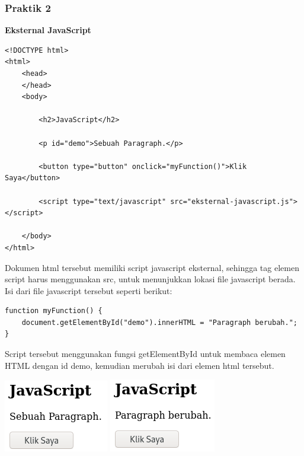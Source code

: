 \documentclass[a4paper,12pt]{article}
\begin{document}
\subsubsection{Praktik 2}
\textbf{Eksternal JavaScript\\}
\begin{lstlisting}
<!DOCTYPE html>
<html>
    <head>
    </head>
    <body>

        <h2>JavaScript</h2>

        <p id="demo">Sebuah Paragraph.</p>

        <button type="button" onclick="myFunction()">Klik Saya</button>

        <script type="text/javascript" src="eksternal-javascript.js"></script>

    </body>
</html>
\end{lstlisting}
Dokumen html tersebut memiliki script javascript eksternal, sehingga tag elemen script harus menggunakan src, untuk
menunjukkan lokasi file javascript berada. Isi dari file javascript tersebut seperti berikut:
\begin{lstlisting}
function myFunction() {
    document.getElementById("demo").innerHTML = "Paragraph berubah.";
}
\end{lstlisting}
Script tersebut menggunakan fungsi getElementById untuk membaca elemen HTML dengan id demo, kemudian merubah isi dari
elemen html tersebut.
\begin{center}
    \includegraphics[scale=.7]{1.png} 
    \includegraphics[scale=.7]{1a.png} 
\end{center}
\end{document}
